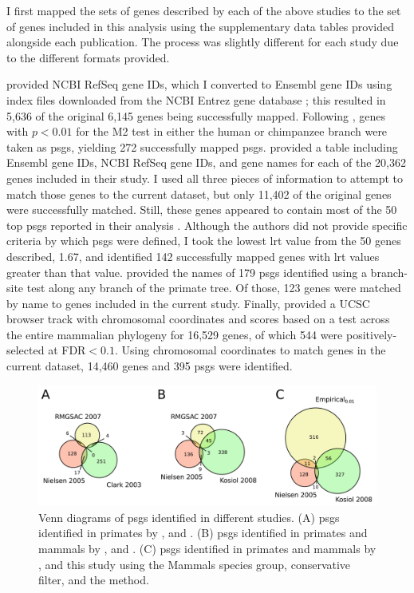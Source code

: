 I first mapped the sets of genes described by each of the above
studies to the set of genes included in this analysis using the
supplementary data tables provided alongside each publication. The
process was slightly different for each study due to the different
formats provided.

\citet{Clark2003} provided NCBI RefSeq gene IDs,
which I converted to Ensembl gene IDs using index files downloaded
from the NCBI Entrez gene database \citep{Maglott2005}; this resulted
in 5,636 of the original 6,145 genes being successfully
mapped. Following \citet{Clark2003}, genes with
$p<0.01$ for the M2 test in either the human or chimpanzee branch were
taken as \acp{psg}, yielding 272 successfully mapped
\acp{psg}. \citet{Nielsen2005} provided a table
including Ensembl gene IDs, NCBI RefSeq gene IDs, and gene names for
each of the 20,362 genes included in their study. I used all three
pieces of information to attempt to match those genes to the current
dataset, but only 11,402 of the original genes were successfully
matched. Still, these genes appeared to contain most of the 50 top
\acp{psg} reported in their analysis \citep{Nielsen2005}. Although the
authors did not provide specific criteria by which \acp{psg} were
defined, I took the lowest \ac{lrt} value from the 50 genes described,
1.67, and identified 142 successfully mapped genes with \ac{lrt}
values greater than that value. \citet{Macaque2007} provided the names of
179 \acp{psg} identified using a branch-site test along any branch of
the primate tree. Of those, 123 genes were matched by name to genes
included in the current study. Finally, \citet{Kosiol2008} provided a UCSC browser track with
chromosomal coordinates and scores based on a test across the entire
mammalian phylogeny for 16,529 genes, of which 544 were
positively-selected at FDR$<0.1$. Using chromosomal coordinates to
match genes in the current dataset, 14,460 genes and 395 \acp{psg}
were identified.

\begin{figure}
\centering
\includegraphics[scale=0.3]{Figs/pub_psg_venn.pdf}
\caption{Venn diagrams of \acp{psg} identified in different
  studies. (A) \acp{psg} identified in primates by \citet{Clark2003},
  \citet{Nielsen2005} and \citet{Macaque2007}. (B) \acp{psg}
  identified in primates and mammals by \citet{Nielsen2005},
  \citet{Macaque2007} and \citet{Kosiol2008}. (C) \acp{psg} identified
  in primates and mammals by \citet{Nielsen2005}, \citet{Kosiol2008}
  and this study using the Mammals species group, conservative filter,
  and the \psgeone method.}
\label{fig_pub_psg_venn}
\end{figure}

